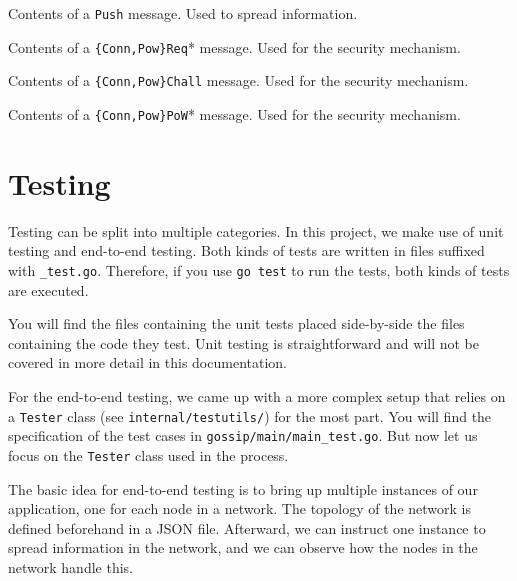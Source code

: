 \documentclass[a4paper,english,10pt,NET]{tumarticle}
\begin{document}
\begin{table}
	\centering
	
	\caption{
		Contents of a \texttt{Push} message.
		Used to spread information.
	}
	\label{tab:push}
\end{table}

\begin{table}
	\centering
	
	\caption{
		Contents of a \texttt{\{Conn,Pow\}Req}* message.
		Used for the security mechanism.
	}
	\label{tab:req}
\end{table}

\begin{table}
	\centering
	
	\caption{
		Contents of a \texttt{\{Conn,Pow\}Chall} message.
		Used for the security mechanism.
	}
	\label{tab:chall}
\end{table}

\begin{table}
	\centering
	
	\caption{
		Contents of a \texttt{\{Conn,Pow\}PoW}* message.
		Used for the security mechanism.
	}
	\label{tab:pow}
\end{table}

\section{Testing} \label{sec:testing}
Testing can be split into multiple categories.
In this project, we make use of unit testing and end-to-end testing.
Both kinds of tests are written in files suffixed with \texttt{\_test.go}.
Therefore, if you use \lstinline{go test} to run the tests, both kinds of tests are executed.

You will find the files containing the unit tests placed side-by-side the files containing the code they test.
Unit testing is straightforward and will not be covered in more detail in this documentation.

For the end-to-end testing, we came up with a more complex setup that relies on a \texttt{Tester} class (see \texttt{internal/testutils/}) for the most part.
You will find the specification of the test cases in \texttt{gossip/main/main\_test.go}.
But now let us focus on the \texttt{Tester} class used in the process.

The basic idea for end-to-end testing is to bring up multiple instances of our application, one for each node in a network.
The topology of the network is defined beforehand in a JSON file.
Afterward, we can instruct one instance to spread information in the network, and we can observe how the nodes in the network handle this.
\end{document}

